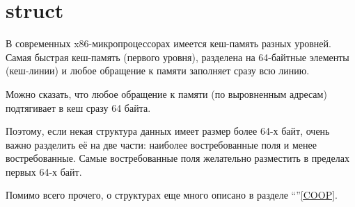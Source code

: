 ﻿\section{struct}

В современных x86-микропроцессорах имеется кеш-память разных уровней. Самая быстрая кеш-память (первого уровня),
разделена на 64-байтные элементы (кеш-линии) и любое обращение к памяти заполняет сразу всю линию.

Можно сказать, что любое обращение к памяти (по выровненным адресам) подтягивает в кеш сразу 64 байта.

Поэтому, если некая структура данных имеет размер более 64-х байт, очень важно разделить её на две части:
наиболее востребованные поля и менее востребованные. Самые востребованные поля желательно разместить в пределах
первых 64-х байт.

Помимо всего прочего, о структурах еще много описано в разделе ``\COOPname''\ref{COOP}.

